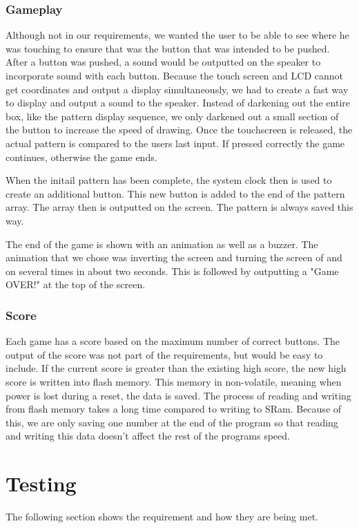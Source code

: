 \documentclass[draft]{article}
\begin{document}
\subsubsection{Gameplay}
Although not in our requirements, we wanted the user to be able to see where he was touching to ensure that was the button that was intended to be pushed.  After a button was pushed, a sound would be outputted on the speaker to  incorporate sound with each button.  Because the touch screen and LCD cannot get coordinates and output a display simultaneously, we had to create a fast way to display and output a sound to the speaker.  Instead of darkening out the entire box, like the pattern display sequence, we only darkened out a small section of the button to increase the speed of drawing.  Once the touchscreen is released, the actual pattern is compared to the users last input.  If pressed correctly the game continues, otherwise the game ends.  
\par
\noindent
When the initail pattern has been complete, the system clock then is used to create an additional button.  This new button is added to the end of the pattern array.  The array then is outputted on the screen.  The pattern is always saved this way.  
\par\noindent
The end of the game is shown with an animation as well as a buzzer.  The animation that we chose was inverting the screen and turning the screen of and on several times in about two seconds.  This is followed by outputting a "Game OVER!" at the top of the screen.

\subsubsection{Score}
Each game has a score based on the maximum number of correct buttons.  The output of the score was not part of the requirements, but would be easy to include.  If the current score is greater than the existing high score, the new high score is written into flash memory.  This memory in non-volatile, meaning when power is lost during a reset, the data is saved.  The process of reading and writing from flash memory takes a long time compared to writing to SRam.    Because of this, we are only saving one number at the end of the program so that reading and writing this data doesn't affect the rest of the programs speed.  

\section{Testing}
The following section shows the requirement and how they are being met.
\end{document}

